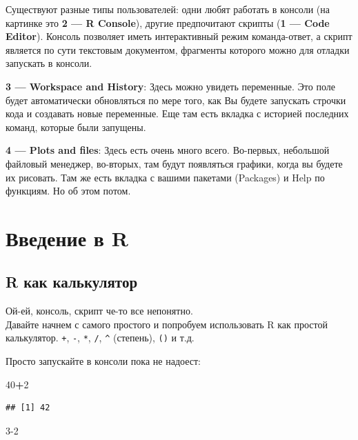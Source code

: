 \documentclass[]{book}
\newenvironment{Shaded}{\begin{snugshade}}{\end{snugshade}}
\newcommand{\DecValTok}[1]{\textcolor[rgb]{0.00,0.00,0.81}{#1}}
\newcommand{\OperatorTok}[1]{\textcolor[rgb]{0.81,0.36,0.00}{\textbf{#1}}}
\begin{document}
Существуют разные типы пользователей: одни любят работать в консоли (на картинке это \textbf{2 --- R Console}), другие предпочитают скрипты (\textbf{1 --- Code Editor}). Консоль позволяет иметь интерактивный режим команда-ответ, а скрипт является по сути текстовым документом, фрагменты которого можно для отладки запускать в консоли.

\textbf{3 --- Workspace and History}: Здесь можно увидеть переменные. Это поле будет автоматически обновляться по мере того, как Вы будете запускать строчки кода и создавать новые переменные. Еще там есть вкладка с историей последних команд, которые были запущены.

\textbf{4 --- Plots and files}: Здесь есть очень много всего. Во-первых, небольшой файловый менеджер, во-вторых, там будут появляться графики, когда вы будете их рисовать. Там же есть вкладка с вашими пакетами (Packages) и Help по функциям. Но об этом потом.

\hypertarget{r}{%
\section{Введение в R}\label{r}}

\hypertarget{calc}{%
\subsection{R как калькулятор}\label{calc}}

Ой-ей, консоль, скрипт че-то все непонятно.\\
Давайте начнем с самого простого и попробуем использовать R как простой калькулятор. \texttt{+}, \texttt{-}, \texttt{*}, \texttt{/}, \texttt{\^{}} (степень), \texttt{()} и т.д.

Просто запускайте в консоли пока не надоест:

\begin{Shaded}
\begin{Highlighting}[]
\DecValTok{40}\OperatorTok{+}\DecValTok{2}
\end{Highlighting}
\end{Shaded}

\begin{verbatim}
## [1] 42
\end{verbatim}

\begin{Shaded}
\begin{Highlighting}[]
\DecValTok{3-2}
\end{Highlighting}
\end{Shaded}
\end{document}
